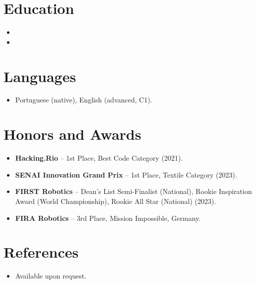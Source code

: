 \documentclass[11pt,a4paper,sans]{moderncv}
\begin{document}

\section{Education}
\vspace{1pt}
\begin{itemize}

\item{}

\vspace{3pt}

\item{}

\end{itemize}


\section{Languages}
\vspace{1pt}
\begin{itemize}
\item Portuguese (native), English (advanced, C1).
\end{itemize}


\section{Honors and Awards}
\vspace{1pt}
\begin{itemize}
\item{\textbf{Hacking.Rio} -- 1st Place, Best Code Category (2021).}
\item{\textbf{SENAI Innovation Grand Prix} -- 1st Place, Textile Category (2023).}
\item{\textbf{FIRST Robotics} -- Dean's List Semi-Finalist (National), Rookie Inspiration Award (World Championship), Rookie All Star (National) (2023).}
\item{\textbf{FIRA Robotics} -- 3rd Place, Mission Impossible, Germany.}
\end{itemize}


\section{References}
\vspace{1pt}
\begin{itemize}
\item{Available upon request.}
\end{itemize}
\end{document}
